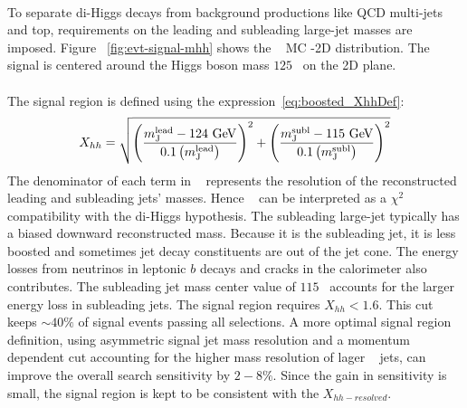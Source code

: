 \paragraph{}
To separate di-Higgs decays from background productions like QCD multi-jets and top, requirements on the leading and subleading large-\R jet masses are imposed.
Figure ~\ref{fig:evt-signal-mhh} shows the \Grav~ MC \mlead-\msubl 2D distribution.
The signal is centered around the Higgs boson mass $125$\GeV~ on the 2D plane.

\paragraph{}
The signal region is defined using the expression~\ref{eq:boosted_XhhDef}:
\begin{equation}
\label{eq:boosted_XhhDef}
X_{hh} = \sqrt{\left(\frac{m^{\rm lead}_{\rm J} - \text{124 GeV}}{0.1 \left(m^{\rm lead}_{\rm J}\right)}\right)^2 + \left(\frac{m^{\rm subl}_{\rm J}- \text{115 GeV}}{0.1 \left(m^{\rm subl}_{\rm J}\right)}\right)^2}
\end{equation}
The denominator of each term in \Xhh~ represents the resolution of the reconstructed leading and subleading jets' masses.
Hence \Xhh~ can be interpreted as a $\chi^2$ compatibility with the di-Higgs hypothesis.
The subleading large-\R jet typically has a biased downward reconstructed mass.
Because it is the subleading jet, it is less boosted and sometimes jet decay constituents are out of the jet cone.
The energy losses from neutrinos in leptonic $b$ decays and cracks in the calorimeter also contributes.
The subleading jet mass center value of $115$\GeV~ accounts for the larger energy loss in subleading jets.
The signal region requires $X_{hh} < 1.6$. 
This cut keeps $\sim 40\%$ of signal events passing all selections. 
A more optimal signal region definition, using asymmetric signal jet mass resolution and a momentum dependent cut accounting for the higher mass resolution of lager \pt~ jets, can improve the overall search sensitivity by $2-8\%$.
Since the gain in sensitivity is small, the signal region is kept to be consistent with the $X_{hh-resolved}$.


